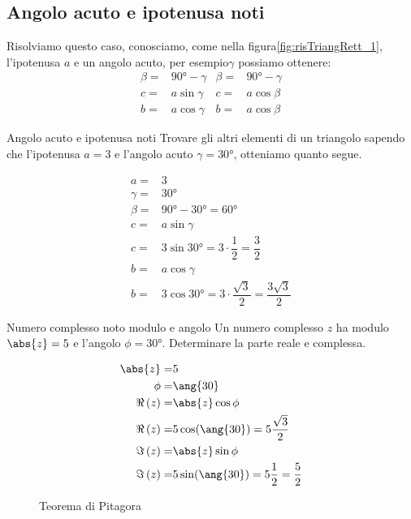 \subsection{Angolo acuto e ipotenusa noti}
Risolviamo questo caso, conosciamo, come nella figura\nobs\vref{fig:risTriangRett_1}, l'ipotenusa $a$ e un angolo acuto, per esempio\nobs$\gamma$ possiamo ottenere:
\begin{align*}
\beta=&\ang{90}-\gamma&\beta=&\ang{90}-\gamma\\
c=&a\sin\gamma&c=&a\cos\beta\\
b=&a\cos\gamma&b=&a\cos\beta
\end{align*}
\begin{esempiot}{Angolo acuto e ipotenusa noti}{}
Trovare gli altri elementi di un triangolo sapendo che l'ipotenusa $a=3$ e l'angolo acuto $\gamma=\ang{30}$,  otteniamo quanto segue.
\end{esempiot}
\begin{align*}
a=&3\\
\gamma=&\ang{30}\\
\beta=&\ang{90}-\ang{30}=\ang{60}\\
c=&a\sin\gamma\\
c=&3\sin\ang{30}=3\cdot\dfrac{1}{2}=\dfrac{3}{2}\\
b=&a\cos\gamma\\
b=&3\cos\ang{30}=3\cdot\dfrac{\sqrt{3}}{2}=\dfrac{3\sqrt{3}}{2}
\end{align*}
\begin{esempiot}{Numero complesso noto modulo e angolo }{}
	Un numero complesso $z$ ha modulo $\abs{z}=5$ e l'angolo $\phi=\ang{30}$.  Determinare la parte reale e complessa.
\end{esempiot}
\begin{align*}
\abs{z}=&5\\
\phi=&\ang{30}\\
\Re\left(z\right)=&\abs{z}\cos\phi\\
\Re\left(z\right)=&5\cos(\ang{30})=5\frac{\sqrt{3}}{2}\\
\Im\left(z\right)=&\abs{z}\sin\phi\\
\Im\left(z\right)=&5\sin(\ang{30})=5\dfrac{1}{2}=\dfrac{5}{2}\\
\end{align*}
\begin{figure}
	\centering
	
	\caption{Teorema di Pitagora}
	\label{fig:TeoremaPitagora_1}
\end{figure}
